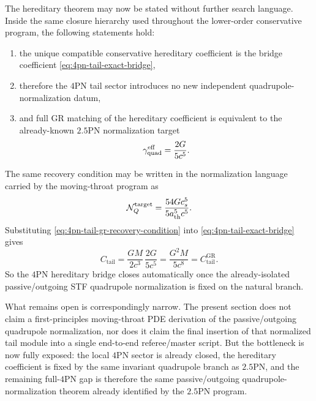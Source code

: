 \documentclass[11pt]{article}
\begin{document}
The hereditary theorem may now be stated without further search language.
Inside the same closure hierarchy used throughout the lower-order conservative
program, the following statements hold:
\begin{enumerate}
  \item the unique compatible conservative hereditary coefficient is the bridge
  coefficient \eqref{eq:4pn-tail-exact-bridge},
  \item therefore the $4$PN tail sector introduces no new independent
  quadrupole-normalization datum,
  \item and full GR matching of the hereditary coefficient is equivalent to the
  already-known $2.5$PN normalization target
  \begin{equation}
  \gamma_{\rm quad}^{\rm eff}
  =
  \frac{2G}{5c^5}.
  \label{eq:4pn-tail-gr-recovery-condition}
  \end{equation}
\end{enumerate}
The same recovery condition may be written in the normalization language carried
by the moving-throat program as
\begin{equation}
\mathcal N_Q^{\rm target}
=
\frac{54Gc_s^5}{5a_{\rm th}^5 c^5}.
\label{eq:4pn-tail-normalization-target}
\end{equation}
Substituting \eqref{eq:4pn-tail-gr-recovery-condition} into
\eqref{eq:4pn-tail-exact-bridge} gives
\begin{equation}
C_{\mathrm{tail}}
=
\frac{GM}{2c^3}\,\frac{2G}{5c^5}
=
\frac{G^2 M}{5c^8}
=
C_{\mathrm{tail}}^{\mathrm{GR}}.
\label{eq:4pn-tail-gr-recovery}
\end{equation}
So the $4$PN hereditary bridge closes automatically once the already-isolated
passive/outgoing STF quadrupole normalization is fixed on the natural branch.

What remains open is correspondingly narrow.  The present section does not claim
a first-principles moving-throat PDE derivation of the passive/outgoing
quadrupole normalization, nor does it claim the final insertion of that
normalized tail module into a single end-to-end referee/master script.  But the
bottleneck is now fully exposed: the local $4$PN sector is already closed, the
hereditary coefficient is fixed by the same invariant quadrupole branch as
$2.5$PN, and the remaining full-$4$PN gap is therefore the same passive/outgoing
quadrupole-normalization theorem already identified by the $2.5$PN program.

\end{document}

